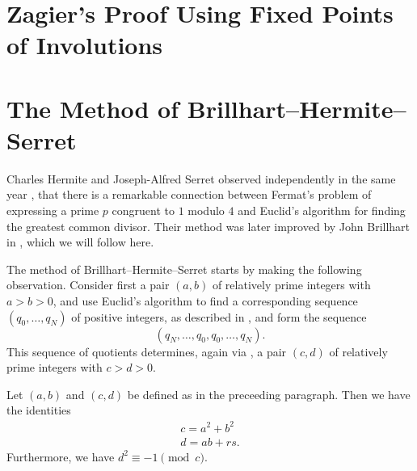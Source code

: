 \begin{noteblock}
\section{Zagier's Proof Using Fixed Points of Involutions}

\section{The Method of Brillhart--Hermite--Serret}

Charles Hermite and Joseph-Alfred Serret observed independently in the same year \cite{hermite1848,serret1848}, that there is a remarkable connection between Fermat's problem of expressing a prime $p$ congruent to $1$ modulo $4$ and Euclid's algorithm for finding the greatest common divisor. Their method was later improved by John Brillhart in \cite{brillhart1972}, which we will follow here.

The method of Brillhart--Hermite--Serret starts by making the following observation. Consider first a pair $(a,b)$ of relatively prime integers with $a>b>0$, and use Euclid's algorithm to find a corresponding sequence $(q_0,\ldots,q_N)$ of positive integers, as described in , and form the sequence
\begin{equation*}
  (q_N,\ldots,q_0,q_0,\ldots,q_N).
\end{equation*}
This sequence of quotients determines, again via , a pair $(c,d)$ of relatively prime integers with $c>d>0$.

\begin{theorem}
  Let $(a,b)$ and $(c,d)$ be defined as in the preceeding paragraph. Then we have the identities
  \begin{align*}
    c = a^2+b^2 \\
    d = ab+rs.
  \end{align*}
  Furthermore, we have $d^2\equiv -1\pmod c$.
\end{theorem}


\end{noteblock}
